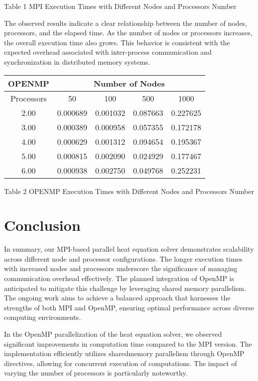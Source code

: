 \documentclass[10pt]{article}
\begin{document}
Table 1 MPI Execution Times with Different Nodes and Processors Number

The observed results indicate a clear relationship between the number of nodes, processors, and the elapsed time. As the number of nodes or processors increases, the overall execution time also grows. This behavior is consistent with the expected overhead associated with inter-process communication and synchronization in distributed memory systems.

\begin{center}
\begin{tabular}{|c|c|c|c|c|}
\hline
OPENMP & \multicolumn{4}{|c|}{Number of Nodes} \\
\hline
Processors & 50 & 100 & 500 & 1000 \\
\hline
2.00 & 0.000689 & 0.001032 & 0.087663 & 0.227625 \\
\hline
3.00 & 0.000389 & 0.000958 & 0.057355 & 0.172178 \\
\hline
4.00 & 0.000629 & 0.001312 & 0.094654 & 0.195367 \\
\hline
5.00 & 0.000815 & 0.002090 & 0.024929 & 0.177467 \\
\hline
6.00 & 0.000938 & 0.002750 & 0.049768 & 0.252231 \\
\hline
\end{tabular}
\end{center}

Table 2 OPENMP Execution Times with Different Nodes and Processors Number

\section{Conclusion}
In summary, our MPI-based parallel heat equation solver demonstrates scalability across different node and processor configurations. The longer execution times with increased nodes and processors underscore the significance of managing communication overhead effectively. The planned integration of OpenMP is anticipated to mitigate this challenge by leveraging shared memory parallelism. The ongoing work aims to achieve a balanced approach that harnesses the strengths of both MPI and OpenMP, ensuring optimal performance across diverse computing environments.

In the OpenMP parallelization of the heat equation solver, we observed significant improvements in computation time compared to the MPI version. The implementation efficiently utilizes sharedmemory parallelism through OpenMP directives, allowing for concurrent execution of computations. The impact of varying the number of processors is particularly noteworthy.
\end{document}
